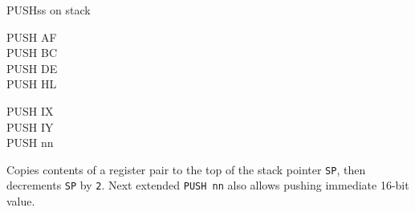 \begin{basedescript}{
	\desclabelstyle{\multilinelabel}
	\desclabelwidth{3cm}}

	\begin{DetailItem}{PUSH}{ss}
		{ on stack}
		{}

		\begin{DetailVariants}
			PUSH AF\\
			PUSH BC\\
			PUSH DE\\
			PUSH HL

			\columnbreak
			PUSH IX\\
			PUSH IY\\

			\columnbreak
			PUSH nn\ZXN
		\end{DetailVariants}

		Copies contents of a register pair to the top of the stack pointer {\tt SP}, then decrements {\tt SP} by {\tt 2}. Next extended {\tt PUSH nn} also allows pushing immediate 16-bit value.

		\begin{DetailEffects}
			\FlagsPUSHrr
		\end{DetailEffects}
				
		\begin{DetailTiming}
		\end{DetailTiming}

	\end{DetailItem}

	\pagebreak



\end{basedescript}
